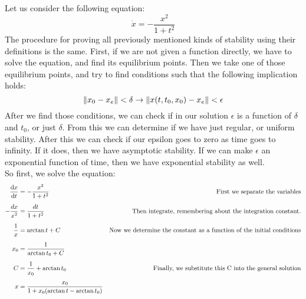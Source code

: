 \ex{}
{
    Let us consider the following equation:
    \begin{equation}
        \label{ex:kurwamac}
        \dot{x} = -\frac{x^{2}}{1+t^{2}}
    \end{equation}
    The procedure for proving all previously mentioned kinds of stability using their definitions is the same. First, if we are not given a function directly, we have to solve the equation, and find its equilibrium points. Then we take one of those equilibrium points, and try to find conditions such that the following implication holds:
    \begin{equation}
        \label{imp}
        \lVert x_0-x_e\rVert < \delta \rightarrow \lVert x(t,t_0,x_0) - x_e\rVert < \epsilon
    \end{equation}
    After we find those conditions, we can check if in our solution $\epsilon$ is a function of $\delta$ and $t_0$, or just $\delta$. From this we can determine if we have just regular, or uniform stability. After this we can check if our epsilon goes to zero as time goes to infinity. If it does, then we have asymptotic stability. If we can make $\epsilon$ an exponential function of time, then we have exponential stability as well.
    \\
    So first, we solve the equation:
    \begin{equation}
    \!\begin{aligned}
        \odv{x}{t} & = -\frac{x^{2}}{1+t^{2}} &\mbox{First we separate the variables}& \\[1.25ex]
        -\frac{dx}{x^{2}}&=\frac{dt}{1+t^{2}}&\mbox{Then integrate, remembering about the integration constant.}&\\[1.25ex]
        \frac{1}{x}&=\arctan{t}+C&\mbox{Now we determine the constant as a function of the initial conditions}\\[1.25ex]
            x_0&=\frac{1}{\arctan{t_0}+C}&\mbox{}\\[1.25ex]
            C&=\frac{1}{x_0}+\arctan{t_0}&\mbox{Finally, we substitute this C into the general solution}\\[1.25ex]
            x&=\frac{x_0}{1+x_0(\arctan{t}-\arctan{t_0})}&\mbox{}\\[1.25ex]
        

\end{aligned}
\end{equation}}
